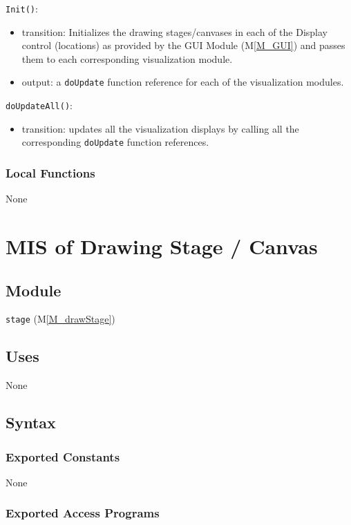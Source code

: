 \documentclass[12pt, titlepage]{article}
\newcommand{\mref}[1]{M\ref{#1}}
\newcommand{\mrefp}[1]{(\mref{#1})}
\newcommand{\mreff}[1]{Module \mrefp{#1}}
\newcommand{\code}[1]{\texttt{#1}}
\begin{document}
\noindent \code{Init()}:
\begin{itemize}
\item transition: Initializes the drawing stages/canvases in each of the Display control (locations)
  as provided by the GUI \mreff{M_GUI} and passes them to each corresponding visualization module.
\item output: a \code{doUpdate} function reference for each of the visualization modules.
\end{itemize}

\noindent \code{doUpdateAll()}:
\begin{itemize}
\item transition: updates all the visualization displays by calling all the corresponding
   \code{doUpdate} function references.
\end{itemize}

\subsubsection{Local Functions}
None

\newpage




\section{MIS of Drawing Stage / Canvas} \label{MS_drawStage}

\subsection{Module}
\code{stage} \mrefp{M_drawStage} 

\subsection{Uses}
None

\subsection{Syntax}

\subsubsection{Exported Constants}
None

\subsubsection{Exported Access Programs}
\end{document}
